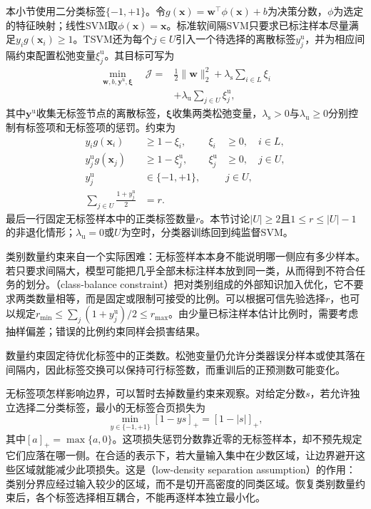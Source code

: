 本小节使用二分类标签$\{-1,+1\}$。令$g(\bm{x})=\bm{w}^{\top}\phi(\bm{x})+b$为决策分数，$\phi$为选定的特征映射；线性SVM取$\phi(\bm{x})=\bm{x}$。标准软间隔SVM只要求已标注样本尽量满足$y_i g(\bm{x}_i)\geq1$。TSVM还为每个$j\in U$引入一个待选择的离散标签$y_j^{\mathrm{u}}$，并为相应间隔约束配置松弛变量$\xi_j^{\mathrm{u}}$。其目标可写为
\begin{equation}
  \label{eq:classification-tsvm-objective}
  \begin{aligned}
    \min_{\bm{w},b,\bm{y}^{\mathrm{u}},\bm{\xi}}\quad
    \mathcal{J}
      ={}&\frac12\lVert\bm{w}\rVert_2^2
         +\lambda_{\mathrm{s}}\sum_{i\in L}\xi_i\\
       &+\lambda_{\mathrm{u}}\sum_{j\in U}\xi_j^{\mathrm{u}},
  \end{aligned}
\end{equation}
其中$\bm{y}^{\mathrm{u}}$收集无标签节点的离散标签，$\bm{\xi}$收集两类松弛变量，$\lambda_{\mathrm{s}}>0$与$\lambda_{\mathrm{u}}\geq0$分别控制有标签项和无标签项的惩罚。约束为
\begin{equation}
  \label{eq:classification-tsvm-constraints}
  \begin{aligned}
    y_i g(\bm{x}_i)&\geq1-\xi_i,
      &\xi_i&\geq0,\quad i\in L,\\
    y_j^{\mathrm{u}}g(\bm{x}_j)&\geq1-\xi_j^{\mathrm{u}},
      &\xi_j^{\mathrm{u}}&\geq0,\quad j\in U,\\
    y_j^{\mathrm{u}}&\in\{-1,+1\},
      &&j\in U,\\
    \sum_{j\in U}\frac{1+y_j^{\mathrm{u}}}{2}&=r.
  \end{aligned}
\end{equation}
最后一行固定无标签样本中的正类标签数量$r$。本节讨论$|U|\geq2$且$1\leq r\leq|U|-1$的非退化情形；$\lambda_{\mathrm{u}}=0$或$U$为空时，分类器训练回到纯监督SVM。

类别数量约束来自一个实际困难：无标签样本本身不能说明哪一侧应有多少样本。若只要求间隔大，模型可能把几乎全部未标注样本放到同一类，从而得到不符合任务的划分。（class-balance constraint）把对类别组成的外部知识加入优化，它不要求两类数量相等，而是固定或限制可接受的比例。可以根据可信先验选择$r$，也可以规定$r_{\min}\leq\sum_j(1+y_j^{\mathrm{u}})/2\leq r_{\max}$。由少量已标注样本估计比例时，需要考虑抽样偏差；错误的比例约束同样会损害结果。

数量约束固定待优化标签中的正类数。松弛变量仍允许分类器误分样本或使其落在间隔内，因此标签交换可以保持可行标签数，而重训后的正预测数可能变化。

无标签项怎样影响边界，可以暂时去掉数量约束来观察。对给定分数$s$，若允许独立选择二分类标签，最小的无标签合页损失为
\begin{equation}
  \label{eq:classification-tsvm-unlabeled-hinge}
  \min_{y\in\{-1,+1\}}[1-ys]_+=[1-|s|]_+,
\end{equation}
其中$[a]_+=\max\{a,0\}$。这项损失惩罚分数靠近零的无标签样本，却不预先规定它们应落在哪一侧。在合适的表示下，若大量输入集中在少数区域，让边界避开这些区域就能减少此项损失。这是（low-density separation assumption）的作用：类别分界应经过输入较少的区域，而不是切开高密度的同类区域。恢复类别数量约束后，各个标签选择相互耦合，不能再逐样本独立最小化。

